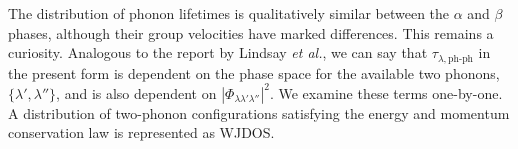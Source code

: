 \documentclass[twocolumn,amsmath,amssymb,a4paper,prb,superscriptaddress,floatfix]{revtex4-1}
\begin{document}
The distribution of phonon lifetimes is qualitatively similar between the $\alpha$ and
$\beta$ phases, although their group velocities have marked differences. This
remains a curiosity. Analogous to the report by Lindsay {\it et
al.}\cite{Lindsay}, we can say that $\tau_{\lambda,\text{ph-ph}}$ in the
present form is dependent on the phase space for the available two phonons,
$\{\lambda', \lambda''\}$, and is also dependent on
$|\Phi_{\lambda\lambda'\lambda''}|^2$. We examine these terms one-by-one. A
distribution of two-phonon configurations satisfying the energy and momentum
conservation law is represented as WJDOS\cite{phono3py}.
\end{document}
